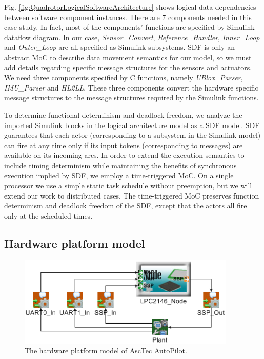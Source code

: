 \documentclass[10pt, conference, compsocconf]{IEEEtran}
\begin{document}
Fig. \ref{fig:QuadrotorLogicalSoftwareArchitecture} shows logical data dependencies between software component instances. There are 7 components needed in this case study. In fact, most of the components' functions are specified by Simulink dataflow diagram. In our case, \emph{Sensor\_Convert}, \emph{Reference\_Handler}, \emph{Inner\_Loop} and \emph{Outer\_Loop} are all specified as Simulink subsystems. SDF is only an abstract MoC to describe data movement semantics for our model, so we must add details regarding specific message structures for the sensors and actuators. We need three components specified by C functions, namely \emph{UBlox\_Parser}, \emph{IMU\_Parser} and \emph{HL2LL}. These three components convert the hardware specific message structures to the message structures required by the Simulink functions.

To determine functional determinism and deadlock freedom, we analyze the imported Simulink blocks in the logical architecture model as a SDF model. SDF guarantees that each actor (corresponding to a subsystem in the Simulink model) can fire at any time only if its input tokens (corresponding to messages) are available on its incoming arcs. In order to extend the execution semantics to include timing determinism while maintaining the benefits of synchronous execution implied by SDF, we employ a time-triggered MoC. On a single processor we use a simple static task schedule without preemption, but we will extend our work to distributed cases.
The time-triggered MoC preserves function determinism and deadlock freedom of the SDF, except that the actors all fire only at the scheduled times.

\subsection{Hardware platform model}

\begin{figure}[!t]
\centering
\includegraphics[width=\columnwidth]{figures/QuadrotorHardwarePlatform.png}
\caption{The hardware platform model of AscTec AutoPilot.}
\label{fig:QuadrotorHardwarePlatform}
\end{figure}
\end{document}
